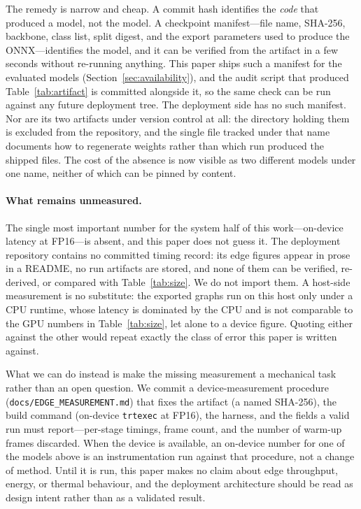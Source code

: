 The remedy is narrow and cheap. A commit hash identifies the \emph{code} that
produced a model, not the model. A checkpoint manifest---file name, SHA-256,
backbone, class list, split digest, and the export parameters used to produce the
ONNX---identifies the model, and it can be verified from the artifact in a few
seconds without re-running anything. This paper ships such a manifest for the
evaluated models (Section~\ref{sec:availability}), and the audit script that
produced Table~\ref{tab:artifact} is committed alongside it, so the same check can
be run against any future deployment tree. The deployment side has no such
manifest. Nor are its two artifacts under version control at all: the directory
holding them is excluded from the repository, and the single file tracked under
that name documents how to regenerate weights rather than which run produced the
shipped files. The cost of the absence is now visible as two different models under
one name, neither of which can be pinned by content.

\paragraph{What remains unmeasured.} The single most important number for the
system half of this work---on-device latency at FP16---is absent, and this paper
does not guess it. The deployment repository contains no committed timing record:
its edge figures appear in prose in a README, no run artifacts are stored, and none
of them can be verified, re-derived, or compared with Table~\ref{tab:size}. We do
not import them. A host-side measurement is no substitute: the exported graphs run
on this host only under a CPU runtime, whose latency is dominated by the CPU and is
not comparable to the GPU numbers in Table~\ref{tab:size}, let alone to a device
figure. Quoting either against the other would repeat exactly the class of error
this paper is written against.

What we can do instead is make the missing measurement a mechanical task rather
than an open question. We commit a device-measurement procedure
(\texttt{docs/EDGE\_MEASUREMENT.md}) that fixes the artifact (a named SHA-256), the
build command (on-device \texttt{trtexec} at FP16), the harness, and the fields a
valid run must report---per-stage timings, frame count, and the number of warm-up
frames discarded. When the device is available, an on-device number for one of the
models above is an instrumentation run against that procedure, not a change of
method. Until it is run, this paper makes no claim about edge throughput, energy,
or thermal behaviour, and the deployment architecture should be read as design
intent rather than as a validated result.